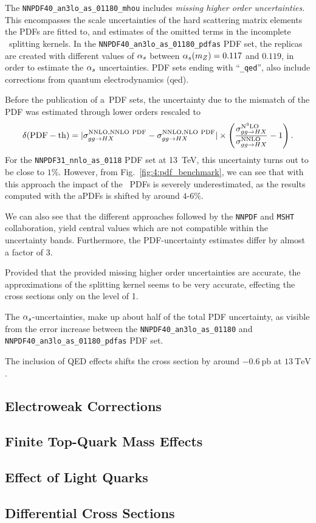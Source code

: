 The \texttt{NNPDF40\_an3lo\_as\_01180\_mhou} includes \textit{missing higher order uncertainties}. This encompasses the scale uncertainties of the hard scattering matrix elements the \acs{PDF}s are fitted to, and estimates of the omitted terms in the incomplete \NNNLO\ splitting kernels. In the \texttt{NNPDF40\_an3lo\_as\_01180\_pdfas} \acs{PDF} set, the replicas are created with different values of $\alpha_s$ between $\alpha_s (m_Z) = 0.117$ and $0.119$, in order to estimate the $\alpha_s$ uncertainties. \acs{PDF} sets ending with ``\texttt{\_qed}'', also include corrections from quantum electrodynamics (\acs{qed}).

Before the publication of a\NNNLO\ \acs{PDF} sets, the uncertainty due to the mismatch of the \acs{PDF} was estimated through lower orders rescaled to \NNNLO
\begin{equation}
\delta (\mathrm{PDF-th}) = \vert \sigma_{gg \rightarrow HX}^{\mathrm{NNLO}, \mathrm{NNLO\ PDF}} - \sigma_{gg \rightarrow HX}^{\mathrm{NNLO}, \mathrm{NLO\ PDF}} \vert \times \left( \frac{\sigma_{gg \rightarrow HX}^{\mathrm{N}^3\mathrm{LO}}}{\sigma_{gg \rightarrow HX}^{\mathrm{NNLO}}} - 1 \right).
\end{equation}
For the \texttt{NNPDF31\_nnlo\_as\_0118} \acs{PDF} set at 13~TeV, this uncertainty turns out to be close to $1\%$. However, from Fig.~\ref{fig:4:pdf_benchmark}, we can see that with this approach the impact of the \NNNLO\ \acs{PDF}s is severely underestimated, as the results computed with the a\NNNLO \acs{PDF}s is shifted by around $4$-$6\%$.

We can also see that the different approaches followed by the \texttt{NNPDF} and \texttt{MSHT} collaboration, yield central values which are not compatible within the uncertainty bands. Furthermore, the \acs{PDF}-uncertainty estimates differ by almost a factor of $3$.

Provided that the provided missing higher order uncertainties are accurate, the approximations of the splitting kernel seems to be very accurate, effecting the cross sections only on the level of 1\textperthousand.

The $\alpha_s$-uncertainties, make up about half of the total \acs{PDF} uncertainty, as visible from the error increase between the \texttt{NNPDF40\_an3lo\_as\_01180} and \texttt{NNPDF40\_an3lo\_as\_01180\_pdfas} \acs{PDF} set.

The inclusion of \acs{QED} effects shifts the cross section by around $-0.6\ \mathrm{pb}$ at $13\ \mathrm{TeV}$.



\subsection{Electroweak Corrections}
\subsection{Finite Top-Quark Mass Effects}
\subsection{Effect of Light Quarks}
\subsection{Differential Cross Sections}
